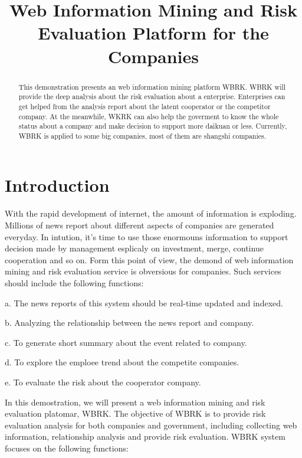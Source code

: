 \documentclass{acm_proc_article-sp}
\begin{document}
\title{Web Information Mining and Risk Evaluation Platform for the Companies}

\maketitle

\begin{abstract}

This demonstration presents an web information mining platform WBRK.
WBRK will provide the deep analysis about the risk evaluation about a enterprise.
Enterprises can get helped from the analysis report about the latent cooperator or the competitor company.
At the meanwhile, WKRK can also help the goverment to know the whole status about a company and make decision to support more daikuan or less.
Currently, WBRK is applied to some big companies, most of them are shangshi companies.

\end{abstract}

\section{Introduction}

With the rapid development of internet, the amount of information is  exploding.
Millions of news report about different aspects of companies are generated everyday.
In intution, it's time to use those enormouns information to support decision made by management esplicaly on investment, merge, continue cooperation and so on.
Form this point of view, the demond of web information mining and risk evaluation service is obversious for companies.
Such services should include the following functions:

a. The news reports of this system should be real-time updated and indexed.

b. Analyzing the relationship between the news report and company.

c. To generate short summary about the event related to company.

d. To explore the emploee trend about the competite companies.

e. To evaluate the risk about the cooperator company.

In this demostration, we will present a web information mining and risk evaluation platomar, WBRK.
The objective of WBRK is to provide risk evaluation analysis for both companies and government, including collecting web information, relationship analysis and provide risk evaluation.
WBRK system focuses on the following functions:
\end{document}
